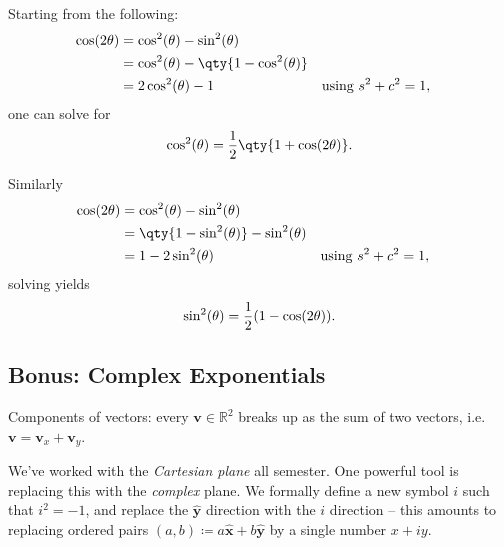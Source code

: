 \begin{corollary}[?]

Starting from the following:
\begin{align*}
\cos(2\theta) 
&= \cos^2(\theta) - \sin^2(\theta) \\
&= \cos^2(\theta) - \qty{1 - \cos^2(\theta) } \\
&= 2\cos^2(\theta) -1 && \text{using } s^2 + c^2 = 1
,\end{align*}
one can solve for
\begin{align*}
\cos^2(\theta) = {1\over 2}\qty{1 + \cos(2\theta) }
.\end{align*}

Similarly
\begin{align*}
\cos(2\theta) 
&= \cos^2(\theta) - \sin^2(\theta) \\
&= \qty{1 - \sin^2(\theta) } - \sin^2(\theta) \\
&= 1-2\sin^2(\theta) && \text{using } s^2 + c^2 = 1
,\end{align*}
solving yields
\begin{align*}
\sin^2(\theta) = {1\over 2} (1 - \cos(2\theta) )
.\end{align*}

\end{corollary}

\hypertarget{bonus-complex-exponentials}{%
\subsection{Bonus: Complex
Exponentials}\label{bonus-complex-exponentials}}

\begin{remark}

Components of vectors: every \(\mathbf{v}\in {\mathbb{R}}^2\) breaks up
as the sum of two vectors,
i.e.~\(\mathbf{v} = \mathbf{v}_x + \mathbf{v}_y\).

\end{remark}

\begin{remark}

We've worked with the \emph{Cartesian plane} all semester. One powerful
tool is replacing this with the \emph{complex} plane. We formally define
a new symbol \(i\) such that \(i^2 = -1\), and replace the
\(\widehat{ \mathbf{y} }\) direction with the \(i\) direction -- this
amounts to replacing ordered pairs
\((a, b) \coloneqq a \widehat{ \mathbf{x} } + b\widehat{ \mathbf{y} }\)
by a single number \(x + iy\).

\end{remark}

